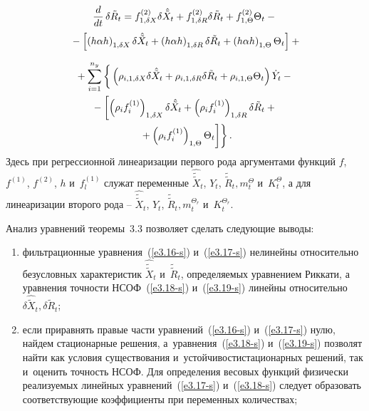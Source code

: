 \begin{multicols}{2}
\noindent
\begin{multline*}
\displaystyle\frac{\displaystyle d\mathstrut}{\displaystyle dt\mathstrut} \,\delta \tilde R_t =f_{1,\delta X}^{(2)} \delta \hat{\tilde 
X}_t + f_{1,\delta R}^{(2)} \delta \tilde R_t + f_{1,\Theta}^{(2)} \Theta_t -{}\\
{}-\left[ 
\left(h\alpha h\right)_{1,\delta X} \delta \hat{\tilde X}_t + \left(h\alpha h\right)_{1,\delta R} \delta 
\tilde R_t + \left(h\alpha h\right)_{1,\Theta} \Theta_t\right] +{}\hspace*{-2pt}
\end{multline*}

\noindent
\begin{multline}
{}+\sum\limits_{i=1}^{n_y} \left\{
\vphantom{\left( \rho_i f_i^{(1)}\right)_{1,\Theta}}
\left(  \rho_{i,1,\delta X}\delta \hat{\tilde X}_t 
+\rho_{i,1,\delta R} \delta \tilde R_t +\rho_{i,1,\Theta} \Theta_t\right)\dot 
Y_t-{}\right.\\
{}-\left[ \left( \rho_i f_i^{(1)}\right)_{1,\delta X} \delta 
\hat{\tilde X}_t +\left( \rho_i f_i^{(1)}\right)_{1,\delta R} \delta \tilde R_t 
+{}\right.\\
\left.\left.{}+\left( \rho_i f_i^{(1)}\right)_{1,\Theta} \Theta_t\right]\right\}.\label{e3.19-s}
\end{multline}
Здесь при регрессионной линеаризации первого рода аргументами функций $f$, 
$f^{(1)}$, $f^{(2)}$, $h$ и~$f_l^{(1)}$ служат переменные $ \hat{\tilde{\tilde X}}_t$, 
$Y_t$,  $\tilde{\tilde R}_t, m_t^\Theta$ и~$K_t^\Theta$, а для линеаризации второго 
рода -- $ \hat{\tilde{\tilde X}}_t$, $Y_t$,  $\tilde{\tilde R}_t, m_t^{\Theta_r}$ 
и~$K_t^{\Theta_r}$.

Анализ уравнений теоремы~3.3 позволяет сделать следующие выводы:
\begin{enumerate}[(1)]
\item фильтрационные уравнения~(\ref{e3.16-s}) и~(\ref{e3.17-s}) нелинейны относительно безусловных 
характеристик $\hat{\tilde{\tilde X}}_t$ и~$\tilde{\tilde R}_t$, определяемых 
уравнением Риккати, а уравнения точности НСОФ~(\ref{e3.18-s}) и~(\ref{e3.19-s}) линейны 
относительно  $\delta \hat{\tilde X}_t, \delta \tilde R_t$;

\item если приравнять правые части уравнений~(\ref{e3.16-s}) и~(\ref{e3.17-s}) нулю, найдем 
стационарные решения, а~уравнения~(\ref{e3.18-s}) и~(\ref{e3.19-s}) позволят \mbox{найти} как условия 
существования и~устой\-чи\-вости\linebreak стационарных решений, так и~оценить точ\-ность НСОФ. 
Для определения весовых функций физически ре\-а\-ли\-зу\-емых линейных уравнений~(\ref{e3.17-s}) 
и~(\ref{e3.18-s}) следует образовать \mbox{со\-от\-вет\-ст\-ву\-ющие} коэффициенты при переменных 
количествах;


\end{enumerate}
\end{multicols}
